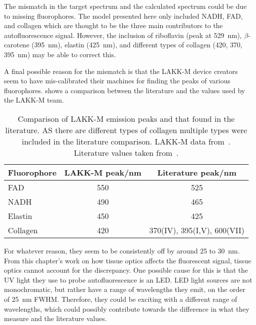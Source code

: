 The mismatch in the target spectrum and the calculated spectrum could be due to missing fluorophores. 
The model presented here only included NADH, FAD, and collagen which are thought to be the three main contributors to the autofluorescence signal.
However, the inclusion of riboflavin (peak at 529~nm), $\beta$-carotene (395~nm), elastin (425~nm), and different types of collagen (420, 370, 395~nm) may be able to correct this.

A final possible reason for the mismatch is that the LAKK-M device creators seem to have mis-calibrated their machines for finding the peaks of various fluorophores.
 shows a comparison between the literature and the values used by the LAKK-M team.

\begin{table}[!htbp]
  \centering

  \begin{tabular}{l|cc}

  \hline
  Fluorophore & LAKK-M peak/nm & Literature peak/nm \\
  \hline
   FAD  & 550& 525\\
   NADH  & 490& 465\\
   Elastin  & 450& 425\\
   Collagen  & 420 & 370(IV), 395(I,V), 600(VII)\\

  \hline

  \end{tabular}
  \caption{Comparison of LAKK-M emission peaks and that found in the literature. AS there are different types of collagen multiple types were included in the literature comparison. LAKK-M data from~\cite{palmer2016changes,dunaev2015individual,smirnova2012collagen,palmer2016development}. Literature values taken from~\cite{dacosta2003molecular,pan2015detection,islam2013ph,patterson2000separation}.}
  \label{tab:flurocompvalues}

\end{table}

For whatever reason, they seem to be consistently off by around 25 to 30~nm.
From this chapter's work on how tissue optics affects the fluorescent signal, tissue optics cannot account for the discrepancy.
One possible cause for this is that the UV light they use to probe autofluorescence is an LED\@.
LED light sources are not monochromatic, but rather have a range of wavelengths they emit, on the order of 25~nm FWHM\@.
Therefore, they could be exciting with a different range of wavelengths, which could possibly contribute towards the difference in what they measure and the literature values.


